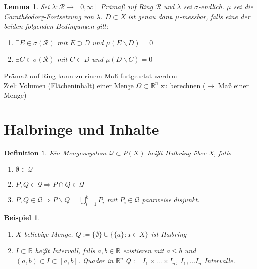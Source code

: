\documentclass[11pt]{memoir}
\theoremstyle{break}
\newtheorem{Definition}{Definition}[chapter]
\newtheorem{Beispiel}{Beispiel}[chapter]
\newtheorem{Lemma}{Lemma}[chapter]
\newcommand{\cara}{Carathéodory-Fortsetzung}
\begin{document}
\begin{Lemma}
Sei $\lambda: \mathscr R \rightarrow [0, \infty]$ Prämaß auf Ring $\mathscr R$ und $\lambda$ sei $\sigma$-endlich. $\mu$ sei die \cara{} von $\lambda$. $D \subset X$ ist genau dann $\mu$-messbar, falls eine der beiden folgenden Bedingungen gilt:
\begin{enumerate}
	\item $\exists E \in \sigma(\mathscr R)$ mit $E \supset D$ und $\mu(E \backslash D) = 0$
	\item $\exists C \in \sigma(\mathscr R)$ mit $C \subset D$ und $\mu(D \backslash C) = 0$
\end{enumerate}
\end{Lemma}

Prämaß auf Ring kann zu einem \underline{Maß} fortgesetzt werden: \\
\underline{Ziel}: Volumen (Flächeninhalt) einer Menge $\Omega \subset \mathbb R^n$ zu berechnen ($\rightarrow$ Maß einer Menge)


\section{Halbringe und Inhalte}
\begin{Definition}
Ein Mengensystem $\mathscr Q \subset P(X)$ heißt \underline{Halbring} über $X$, falls
\begin{enumerate}
	\item $\emptyset \in \mathscr Q$
	\item $P, Q \in \mathscr Q \Rightarrow P \cap Q \in \mathscr Q$
	\item $P, Q \in \mathscr Q \Rightarrow P \backslash Q = \bigcup\limits_{i=1}^k P_i$ mit $P_i \in \mathscr Q$ paarweise disjunkt.
\end{enumerate}
\end{Definition}

\begin{Beispiel}
\begin{enumerate}
	\item $X$ beliebige Menge. $Q := \{\emptyset\} \cup \{\{a\}:  a \in X\}$ ist Halbring 
	\item $I \subset \mathbb R$ heißt \underline{Intervall}, falls $a, b \in \mathbb R$ existieren mit $a \leq b$ und $(a, b) \subset \overline{I} \subset [a, b]$. Quader in $\mathbb R^n$ $ Q:= I_1 \times ... \times I_n$,  $I_1, ... I_n$ Intervalle.
\end{enumerate}
\end{Beispiel}
\end{document}
